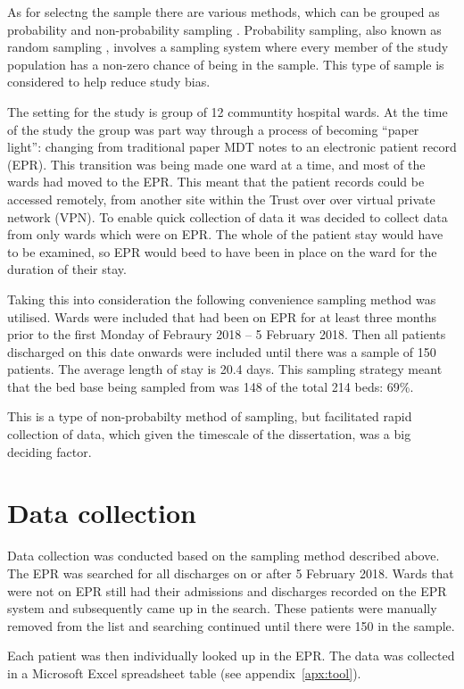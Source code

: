 \documentclass
[
	12pt,
	a4paper,
	oneside,
]{report}
\begin{document}
As for selectng the sample there are various methods, which can be grouped as 
probability and non-probability sampling \parencite{parahoo:14}. Probability 
sampling, also known as random sampling \parencite{biggam:15}, involves a 
sampling system where every
member of the study population has a non-zero chance of being in the sample.
This type of sample is considered to help reduce study bias.

The setting for the study is group of 12 
communtity hospital wards. At the time of the study the group was part way 
through a process of becoming ``paper light'': changing from traditional paper
MDT notes to an electronic patient record (EPR). This transition was being made
one ward at a time, and most of the wards had moved to the EPR. This meant that 
the patient records could be accessed remotely, from another site within the 
Trust over over virtual private network (VPN). To enable quick collection of data
it was decided to collect data from only wards which were on EPR. The whole of the 
patient stay would have to be examined, so EPR would beed to have been in place
on the ward for the duration of their stay.

Taking this into consideration the following convenience sampling method was 
utilised. Wards were included that had been on EPR for at least three months
prior to the first Monday of Febraury 2018 -- 5 February 2018. Then all patients
discharged on this date onwards were included until there was a sample of 150
patients. The average length of stay is 20.4 days. This sampling strategy 
meant that the bed base being sampled from was 148 of the total 214 beds: 69\%.

This is a type of non-probabilty method of sampling, but facilitated rapid
collection of data, which given the timescale of the dissertation, was a big
deciding factor.

\section{Data collection}

Data collection was conducted based on the sampling method described above.
The EPR was searched for all discharges on or after 5 February 2018. Wards
that were not on EPR still had their admissions and discharges recorded on the
EPR system and subsequently came up in the search. These patients were 
manually removed from the list and searching continued until there were 150
in the sample.

Each patient was then individually looked up in the EPR. The data was
collected in a Microsoft Excel spreadsheet table (see appendix~\ref{apx:tool}).
\end{document}
